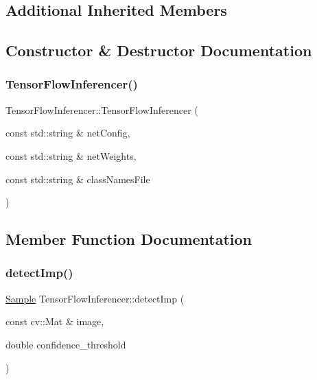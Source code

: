\subsection*{Additional Inherited Members}


\subsection{Constructor \& Destructor Documentation}
\mbox{\label{class_tensor_flow_inferencer_a78ef7a49464aeb0d846910cda36b33cc}} 
\subsubsection{\texorpdfstring{Tensor\+Flow\+Inferencer()}{TensorFlowInferencer()}}
{\footnotesize\ttfamily Tensor\+Flow\+Inferencer\+::\+Tensor\+Flow\+Inferencer (\begin{DoxyParamCaption}\item[{const std\+::string \&}]{net\+Config,  }\item[{const std\+::string \&}]{net\+Weights,  }\item[{const std\+::string \&}]{class\+Names\+File }\end{DoxyParamCaption})}



\subsection{Member Function Documentation}
\mbox{\label{class_tensor_flow_inferencer_ae8b603ab05273a9ec5fee720f23d0c58}} 
\subsubsection{\texorpdfstring{detect\+Imp()}{detectImp()}}
{\footnotesize\ttfamily \hyperlink{struct_sample}{Sample} Tensor\+Flow\+Inferencer\+::detect\+Imp (\begin{DoxyParamCaption}\item[{const cv\+::\+Mat \&}]{image,  }\item[{double}]{confidence\+\_\+threshold }\end{DoxyParamCaption})\hspace{0.3cm}{\ttfamily [virtual]}}



